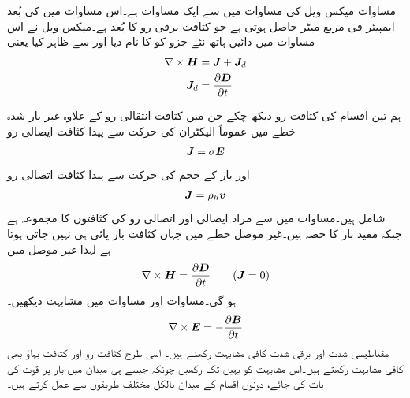 مساوات  میکس ویل کی مساوات میں سے ایک مساوات ہے۔اس مساوات میں  کی بُعد ایمپیئر فی مربع میٹر حاصل ہوتی ہے جو کثافت برقی رو کا بُعد ہے۔میکس ویل نے اس مساوات میں دائیں ہاتھ نئے جزو  کو  کا نام دیا اور  سے ظاہر کیا یعنی
\begin{gather}
\begin{aligned}\label{مساوات-میکس_ویل_دوسری_مساوات_نقطہ_شکل_ب}
\nabla \times {\ensuremath{{\boldsymbol{H}}}}&={{\boldsymbol{J}}}+{{\boldsymbol{J}}}_d\\
{{\boldsymbol{J}}}_d&=\frac{\partial {\ensuremath{{\boldsymbol{D}}}}}{\partial t}
\end{aligned}
\end{gather}

ہم تین اقسام کی کثافت رو دیکھ چکے جن میں کثافت انتقالی رو کے علاوہ  غیر بار شدہ خطے میں عموماً الیکٹران کی حرکت سے پیدا  کثافت ایصالی رو
\begin{align}
{\ensuremath{{\boldsymbol{J}}}}=\sigma {\ensuremath{{\boldsymbol{E}}}}
\end{align}
اور بار کے حجم کی حرکت سے پیدا کثافت اتصالی رو
\begin{align}
{\ensuremath{{\boldsymbol{J}}}}=\rho_h {{\boldsymbol{v}}}
\end{align}
شامل ہیں۔مساوات  میں  سے مراد ایصالی اور اتصالی رو کی کثافتوں کا مجموعہ ہے جبکہ مقید بار  کا حصہ ہیں۔غیر موصل خطے میں جہاں کثافت بار پائی ہی نہیں جاتی  ہوتا ہے لہٰذا غیر موصل میں
\begin{align}\label{مساوات_میکس_ویل_مقناطیسی_شدت_گردش}
\nabla \times {\ensuremath{{\boldsymbol{H}}}}=\frac{\partial {\ensuremath{{\boldsymbol{D}}}}}{\partial t}  \quad \quad ({{\boldsymbol{J}}}=0)
\end{align}
ہو گی۔مساوات  اور مساوات  میں مشابہت دیکھیں۔
\begin{align*}
\nabla \times {\ensuremath{{\boldsymbol{E}}}}=-\frac{\partial {\ensuremath{{\boldsymbol{B}}}}}{\partial t}
\end{align*} 
مقناطیسی شدت  اور برقی شدت  کافی مشابہت رکھتے ہیں۔ اسی طرح کثافت رو  اور کثافت بہاؤ  بھی کافی مشابہت رکھتے ہیں۔اس مشابہت کو یہیں تک رکھیں چونکہ جیسے ہی میدان میں بار پر قوت کی بات کی جائے، دونوں اقسام کے میدان بالکل مختلف طریقوں سے  عمل کرتے ہیں۔

